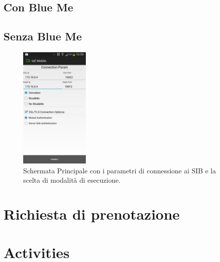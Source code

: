 \subsection{Con Blue Me}

\subsection{Senza Blue Me}


\begin{figure}
	\centering
	\includegraphics[width=0.3\textwidth]{assets/mobile-app-main.png}
	\caption{Schermata Principale con i parametri di connessione ai SIB e la scelta di modalità di esecuzione.}
	\label{fig:main-activity}
\end{figure}


\section{Richiesta di prenotazione}

\section{Activities}
